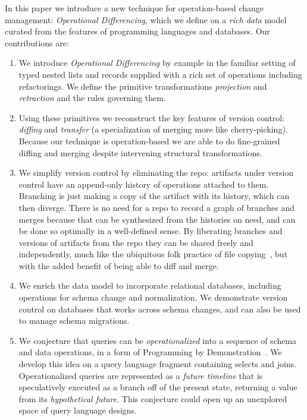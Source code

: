 \documentclass[english,submission]{programming}
\theoremstyle{definition}
\begin{document}
In this paper we introduce a new technique for operation-based change management: \textit{Operational Differencing}, which we define on a \textit{rich data} model curated from the features of programming languages and databases. Our contributions are:

\begin{enumerate}

\item We introduce \textit{Operational Differencing} by example in the familiar setting of typed nested lists and records supplied with a rich set of operations
including refactorings. We define the primitive transformations \textit{projection} and \textit{retraction} and the rules governing them.

\item Using these primitives we reconstruct the key features of version control: \textit{diffing} and \textit{transfer} (a specialization of merging more like cherry-picking). Because our technique is operation-based we are able to do fine-grained diffing and merging despite intervening structural transformations.

\item We simplify version control by eliminating the repo: artifacts under version control have an append-only history of operations attached to them. Branching is just making a copy of the artifact with its history, which can then diverge. There is no need for a repo to record a graph of branches and merges because that can be synthesized from the histories on need, and can be done so optimally in a well-defined sense. By liberating branches and versions of artifacts from the repo they can be shared freely and independently, much like the ubiquitous folk practice of file copying~\cite{Burnett14, Basman19}, but with the added benefit of being able to diff and merge.

\item We enrich the data model to incorporate relational databases, including operations for schema change and normalization. We demonstrate version control on databases that works across schema changes, and can also be used to manage schema migrations.

\item We conjecture that queries can be \textit{operationalized} into a sequence of schema and data operations, in a form of Programming by Demonstration~\cite{cypher93-pbd}. We develop this idea on a query language fragment containing selects and joins. Operationalized queries are represented as a \textit{future timeline} that is speculatively executed as a branch off of the present state, returning a value from its \textit{hypothetical future}. This conjecture could open up an unexplored space of query language designs.


\end{enumerate}
\end{document}
